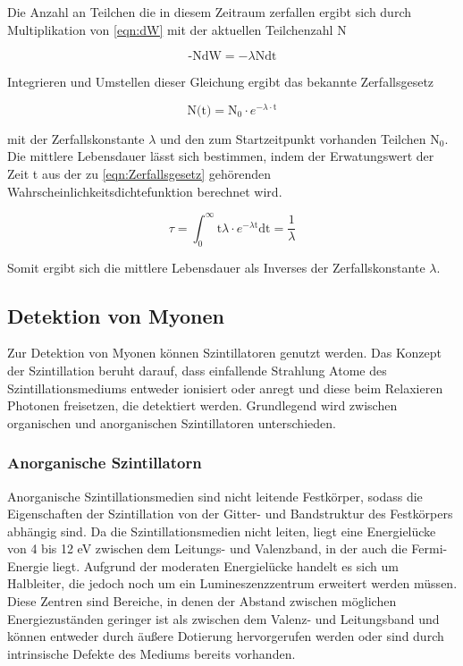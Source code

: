         Die Anzahl an Teilchen die in diesem Zeitraum zerfallen ergibt sich durch Multiplikation von \eqref{eqn:dW} mit der aktuellen Teilchenzahl N

        \begin{equation*}
            \text{-NdW} = -\lambda \text{Ndt}
        \end{equation*}

        Integrieren und Umstellen dieser Gleichung ergibt das bekannte Zerfallsgesetz
        
        \begin{equation}
            \text{N(t)} = \text{N}_0 \cdot e^{- \lambda \cdot \text{t}}
            \label{eqn:Zerfallsgesetz}
        \end{equation}

        mit der Zerfallskonstante $\lambda$ und den zum Startzeitpunkt vorhanden Teilchen $\text{N}_0$. Die mittlere Lebensdauer lässt sich bestimmen, indem der Erwatungswert der Zeit t aus der zu 
        \eqref{eqn:Zerfallsgesetz} gehörenden Wahrscheinlichkeitsdichtefunktion berechnet wird.

        \begin{equation}
            \tau = \int_0^{\infty} \text{t} \lambda \cdot e^{-\lambda \text{t}} \text{dt} = \frac{1}{\lambda}
            \label{eqn:mittlere_Lebensdauer}
        \end{equation}

        Somit ergibt sich die mittlere Lebensdauer als Inverses der Zerfallskonstante $\lambda$.

    \newpage
    \subsection{Detektion von Myonen}
        Zur Detektion von Myonen können Szintillatoren genutzt werden. Das Konzept der Szintillation beruht darauf, dass einfallende Strahlung Atome des Szintillationsmediums entweder ionisiert oder anregt und 
        diese beim Relaxieren Photonen freisetzen, die detektiert werden. Grundlegend wird zwischen organischen und anorganischen Szintillatoren unterschieden.

            \subsubsection*{Anorganische Szintillatorn}
                Anorganische Szintillationsmedien sind nicht leitende Festkörper, sodass die Eigenschaften der Szintillation von der Gitter- und Bandstruktur des Festkörpers abhängig sind. Da die 
                Szintillationsmedien nicht leiten, liegt eine Energielücke von 4 bis 12 eV zwischen dem Leitungs- und Valenzband, in der auch die Fermi-Energie liegt. Aufgrund der moderaten Energielücke 
                handelt es sich um Halbleiter, die jedoch noch um ein Lumineszenzzentrum erweitert werden müssen. Diese Zentren sind Bereiche, in denen der Abstand zwischen möglichen Energiezuständen geringer 
                ist als zwischen dem Valenz- und Leitungsband und können entweder durch äußere Dotierung hervorgerufen werden oder sind durch intrinsische Defekte des Mediums bereits vorhanden.
                

